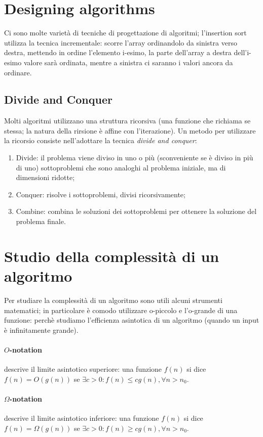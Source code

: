\documentclass{article}
\begin{document}
\section{Designing algorithms}
Ci sono molte varietà di tecniche di progettazione di algoritmi; l'insertion
sort utilizza la tecnica incrementale: scorre l'array ordinandolo da sinistra
verso destra, mettendo in ordine l'elemento i-esimo, la parte dell'array a
destra dell'i-esimo valore sarà ordinata, mentre a sinistra ci saranno i valori
ancora da ordinare.

\subsection{Divide and Conquer}
Molti algoritmi utilizzano una struttura ricorsiva (una funzione che richiama se
stessa; la natura della rirsione è affine con l'iterazione). Un metodo per
utilizzare la ricorsio consiste nell'adottare la tecnica \textit{divide and
conquer}: 
\begin{enumerate}
    \item Divide: il problema viene diviso in uno o più (sconveniente se è
        diviso in più di uno) sottoproblemi che sono analoghi al problema
        iniziale, ma di dimensioni ridotte;
    \item Conquer: risolve i sottoproblemi, divisi ricorsivamente;
    \item Combine: combina le soluzioni dei sottoproblemi per ottenere la
        soluzione del problema finale.
\end{enumerate}

\section{Studio della complessità di un algoritmo}
Per studiare la complessità di un algoritmo sono utili alcuni strumenti
matematici; in particolare è comodo utilizzare o-piccolo e l'o-grande di una
funzione: perchè studiamo l'efficienza asintotica di un algoritmo (quando un
input è infinitamente grande).

\paragraph{$O$-notation} descrive il limite asintotico superiore: una funzione
$f(n)$ si dice $f(n)= O(g(n))$ se $\exists c>0:f(n) \leq cg(n), \forall n>n_0$.

\paragraph{$\Omega$-notation} descrive il limite asintotico inferiore: una funzione
$f(n)$ si dice $f(n)= \Omega(g(n))$ se $\exists c>0:f(n) \geq cg(n), \forall n>n_0$.
\end{document}
